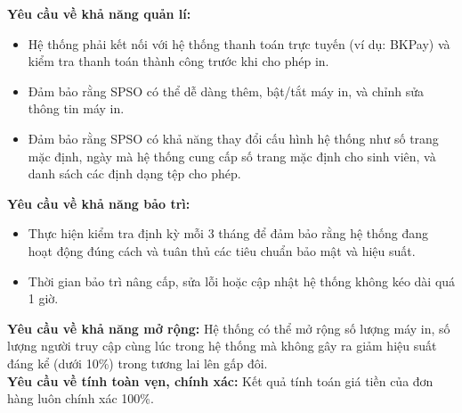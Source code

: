         \textbf{Yêu cầu về khả năng quản lí:}
                \begin{itemize}
                \item Hệ thống phải kết nối với hệ thống thanh toán trực tuyến (ví dụ: BKPay) và kiểm tra thanh toán thành công trước khi cho phép in.
                \item Đảm bảo rằng SPSO có thể dễ dàng thêm, bật/tắt máy in, và chỉnh sửa thông tin máy in.
                \item Đảm bảo rằng SPSO có khả năng thay đổi cấu hình hệ thống như số trang mặc định, ngày mà hệ thống cung cấp số trang mặc định cho sinh viên, và danh sách các định dạng tệp cho phép.
                \end{itemize}
                
        \textbf{Yêu cầu về khả năng bảo trì:}
                \begin{itemize}
                \item Thực hiện kiểm tra định kỳ mỗi 3 tháng để đảm bảo rằng hệ thống đang hoạt động đúng cách và tuân thủ các tiêu chuẩn bảo mật và hiệu suất.
                \item Thời gian bảo trì nâng cấp, sửa lỗi hoặc cập nhật hệ thống không kéo dài quá 1 giờ.
                \end{itemize}
                
        \textbf{Yêu cầu về khả năng mở rộng:} Hệ thống có thể mở rộng số lượng máy in, số lượng người truy cập cùng lúc trong hệ thống mà không gây ra giảm hiệu suất đáng kể (dưới 10\%) trong tương lai lên gấp đôi. \\
        
        \textbf{Yêu cầu về tính toàn vẹn, chính xác:} Kết quả tính toán giá tiền của đơn hàng luôn chính xác 100\%.  